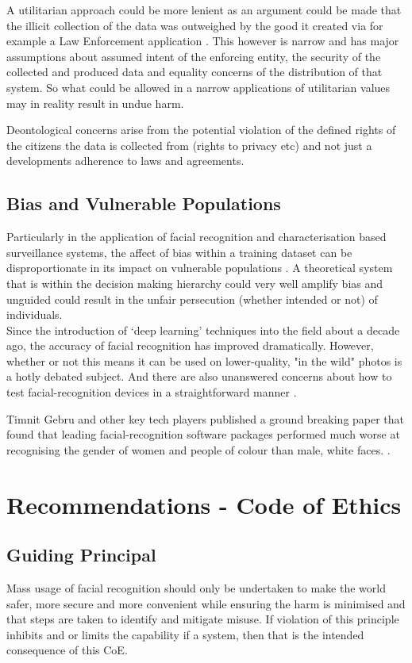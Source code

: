 \documentclass[11pt]{article}
\begin{document}
A utilitarian approach could be more lenient as an argument could be made that the illicit collection of the data was outweighed by the good it created via for example a Law Enforcement application \cite{ethics_book}. This however is narrow and has major assumptions about assumed intent of the enforcing entity, the security of the collected and produced data and equality concerns of the distribution of that system. So what could be allowed in a narrow applications of utilitarian values may in reality result in undue harm.

Deontological concerns arise from the potential violation of the defined rights of the citizens the data is collected from (rights to privacy etc) and not just a developments adherence to laws and agreements.   

\subsection{Bias and Vulnerable Populations}
Particularly in the application of facial recognition and characterisation based surveillance systems, the affect of bias within a training dataset can be disproportionate in its impact on vulnerable populations \cite{nature_main}. A theoretical system that is within the decision making hierarchy could very well amplify bias and unguided could result in the unfair persecution (whether intended or not) of individuals. \\

Since the introduction of ‘deep learning' techniques into the field about a decade ago, the accuracy of facial recognition has improved dramatically. However, whether or not this means it can be used on lower-quality, "in the wild" photos is a hotly debated subject. And there are also unanswered concerns about how to test facial-recognition devices in a straightforward manner \cite{nature_bias}.

Timnit Gebru and other key tech players published a ground breaking paper that found that leading facial-recognition software packages performed much worse at recognising the gender of women and people of colour than male, white faces. \cite{nature_bias}.

\section{Recommendations - Code of Ethics}

\subsection*{Guiding Principal}
Mass usage of facial recognition should only be undertaken to make the world safer, more secure and more convenient while ensuring the harm is minimised and that steps are taken to identify and mitigate misuse. If violation of this principle inhibits and or limits the capability if a system, then that is the intended consequence of this CoE.
\end{document}
